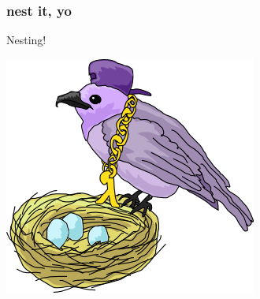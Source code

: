 \documentclass{beamer}
\begin{document}
\begin{frame}
    \frametitle{nest it, yo}
    \begin{center}
        \huge
        Nesting!
        \newline
        
        \includegraphics[scale=0.5]{images/nest.png}
    \end{center}
\end{frame}
\end{document}
